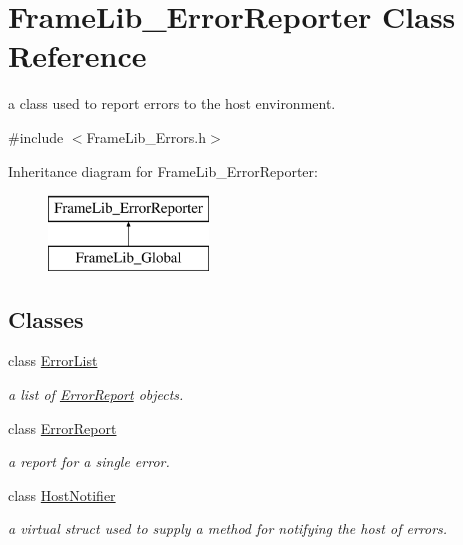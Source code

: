 \hypertarget{class_frame_lib___error_reporter}{}\section{Frame\+Lib\+\_\+\+Error\+Reporter Class Reference}
\label{class_frame_lib___error_reporter}


a class used to report errors to the host environment.  




{\ttfamily \#include $<$Frame\+Lib\+\_\+\+Errors.\+h$>$}

Inheritance diagram for Frame\+Lib\+\_\+\+Error\+Reporter\+:\begin{figure}[H]
\begin{center}
\leavevmode
\includegraphics[height=2.000000cm]{class_frame_lib___error_reporter}
\end{center}
\end{figure}
\subsection*{Classes}
\begin{DoxyCompactItemize}
\item 
class \hyperlink{class_frame_lib___error_reporter_1_1_error_list}{Error\+List}
\begin{DoxyCompactList}\small\item\em a list of \hyperlink{class_frame_lib___error_reporter_1_1_error_report}{Error\+Report} objects. \end{DoxyCompactList}\item 
class \hyperlink{class_frame_lib___error_reporter_1_1_error_report}{Error\+Report}
\begin{DoxyCompactList}\small\item\em a report for a single error. \end{DoxyCompactList}\item 
class \hyperlink{struct_frame_lib___error_reporter_1_1_host_notifier}{Host\+Notifier}
\begin{DoxyCompactList}\small\item\em a virtual struct used to supply a method for notifying the host of errors. \end{DoxyCompactList}\end{DoxyCompactItemize}
